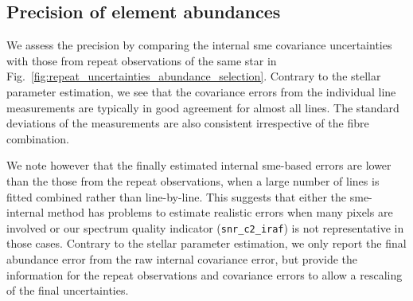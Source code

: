 \documentclass[fleqn,usenatbib,useAMS]{mnras}
\begin{document}


\subsection{Precision of element abundances}

We assess the precision by comparing the internal {\sc sme} covariance uncertainties with those from repeat observations of the same star in Fig.~\ref{fig:repeat_uncertainties_abundance_selection}. Contrary to the stellar parameter estimation, we see that the covariance errors from the individual line measurements are typically in good agreement for almost all lines. The standard deviations of the measurements are also consistent irrespective of the fibre combination. 

We note however that the finally estimated internal {\sc sme}-based errors are lower than the those from the repeat observations, when a large number of lines is fitted combined rather than line-by-line. This suggests that either the {\sc sme}-internal method has problems to estimate realistic errors when many pixels are involved or our spectrum quality indicator (\texttt{snr\_c2\_iraf}) is not representative in those cases. Contrary to the stellar parameter estimation, we only report the final abundance error from the raw internal covariance error, but provide the information for the repeat observations and covariance errors to allow a rescaling of the final uncertainties.
\end{document}

